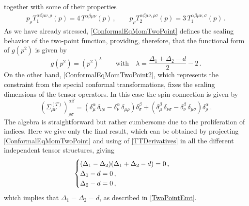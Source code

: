 \documentclass[a4paper,11pt,openright,twoside]{book}
\numberwithin{equation}{section}
\begin{document}
together with some of their properties
\begin{eqnarray}
	p_\rho T_1^{\alpha\beta\mu\nu, \rho}(p) = 4 \, T^{\alpha\beta\mu\nu}(p) \,, \qquad
	p_\rho T_2^{\alpha\beta\mu\nu, \rho \sigma}(p) = 3 \, T_1^{\alpha\beta\mu\nu, \sigma}(p)  \,.
\end{eqnarray}
As we have already stressed, \eqref{ConformalEqMomTwoPoint} defines the scaling behavior of the two-point function, providing, therefore, that the functional form of $g(p^2)$ is given by
\begin{equation}
	g(p^2) = (p^2)^\lambda \qquad \mbox{with} \quad \lambda = \frac{\Delta_1 +\Delta_2 -d}{2} -2 \,.
\end{equation}
On the other hand, \eqref{ConformalEqMomTwoPoint2}, which represents the constraint from the special conformal transformations, fixes the scaling dimensions of the tensor operators. In this case the spin connection is given by
\begin{equation}
	(\Sigma_{\mu\nu}^{(T)})^{\alpha \beta}_{\rho \sigma } = \left( \delta_{\mu}^{\alpha} \, \delta_{\nu \rho} - \delta_{\nu}^{\alpha} \, \delta_{\mu \rho} \right) \delta_{\sigma}^{\beta}
	+ \left( \delta_{\mu}^{\beta} \, \delta_{\nu \sigma} - \delta_{\nu}^{\beta} \, \delta_{\mu \sigma} \right) \delta_{\rho}^{\alpha} \,.
\end{equation}
The algebra is straightforward but rather cumbersome due to the proliferation of indices. Here we give only the final result, which can be obtained by projecting \eqref{ConformalEqMomTwoPoint} and using of \eqref{TTDerivatives} in all the different independent tensor structures, giving
\begin{equation}
	\begin{cases}
		(\Delta_1 - \Delta_2) (\Delta_1 + \Delta_2 - d) = 0 \,, \notag \\
		\Delta_1 - d = 0 \,, \notag \\
		\Delta_2 - d = 0 \,, \notag
	\end{cases}
	\\
\end{equation}
which implies that $\Delta_1 = \Delta_2 = d$, as described in \eqref{TwoPointEmt}.
\end{document}
